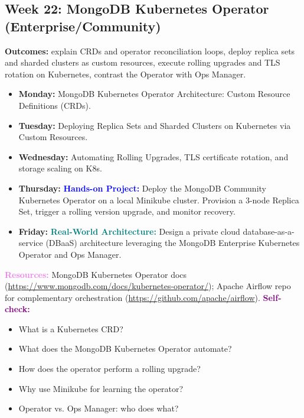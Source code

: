 \documentclass[11pt, a4paper]{article}
\newcommand{\project}[1]{\textbf{\textcolor{blue}{Hands-on Project:}} #1}
\newcommand{\usecase}[1]{\textbf{\textcolor{teal}{Real-World Architecture:}} #1}
\newcommand{\dayitem}[2]{\item \textbf{#1:} #2}
\newcommand{\selfcheck}[1]{\vspace{1mm}\noindent\textbf{\textcolor{purple}{Self-check:}} #1}
\newcommand{\resources}[1]{\vspace{1mm}\noindent\textbf{\textcolor{violet}{Resources:}} #1}
\begin{document}
\subsection*{Week 22: MongoDB Kubernetes Operator (Enterprise/Community)}
\par\noindent\textbf{Outcomes:} explain CRDs and operator reconciliation loops, deploy replica sets and sharded clusters as custom resources, execute rolling upgrades and TLS rotation on Kubernetes, contrast the Operator with Ops Manager.
\begin{itemize}[label=-]
    \dayitem{Monday}{MongoDB Kubernetes Operator Architecture: Custom Resource Definitions (CRDs).}
    \dayitem{Tuesday}{Deploying Replica Sets and Sharded Clusters on Kubernetes via Custom Resources.}
    \dayitem{Wednesday}{Automating Rolling Upgrades, TLS certificate rotation, and storage scaling on K8s.}
    \dayitem{Thursday}{\project{Deploy the MongoDB Community Kubernetes Operator on a local Minikube cluster. Provision a 3-node Replica Set, trigger a rolling version upgrade, and monitor recovery.}}
    \dayitem{Friday}{\usecase{Design a private cloud database-as-a-service (DBaaS) architecture leveraging the MongoDB Enterprise Kubernetes Operator and Ops Manager.}}
\end{itemize}
\resources{MongoDB Kubernetes Operator docs (\url{https://www.mongodb.com/docs/kubernetes-operator/}); Apache Airflow repo for complementary orchestration (\url{https://github.com/apache/airflow}).}
\selfcheck{\begin{itemize}[label=-, itemsep=0pt, leftmargin=1.5em]
    \item What is a Kubernetes CRD?
    \item What does the MongoDB Kubernetes Operator automate?
    \item How does the operator perform a rolling upgrade?
    \item Why use Minikube for learning the operator?
    \item Operator vs. Ops Manager: who does what?
\end{itemize}}
\end{document}
